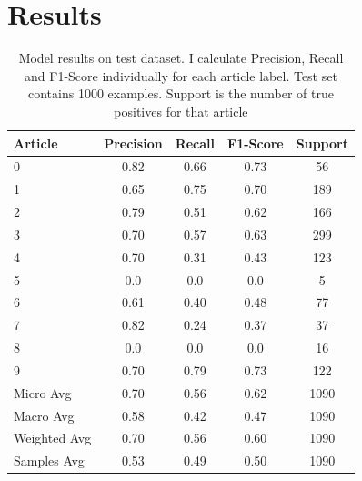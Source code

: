 \documentclass{article}
\begin{document}
\section{Results}

\begin{table}[H]
    \centering
    \begin{tabular}{|l|c|c|c|c|}
    \hline
        Article & Precision & Recall & F1-Score & Support \\ \hline
        0 & 0.82 & 0.66 & 0.73 & 56 \\ \hline
        1 & 0.65 & 0.75 & 0.70 & 189 \\ \hline
        2 & 0.79 & 0.51 & 0.62 & 166 \\ \hline
        3 & 0.70 & 0.57& 0.63& 299 \\ \hline
        4 & 0.70& 0.31& 0.43& 123 \\ \hline
        5 & 0.0 & 0.0 & 0.0 & 5 \\ \hline
        6 & 0.61& 0.40& 0.48& 77 \\ \hline
        7 & 0.82& 0.24& 0.37& 37 \\ \hline
        8 & 0.0 & 0.0 & 0.0 & 16 \\ \hline
        9 & 0.70& 0.79& 0.73& 122 \\ \hline
        Micro Avg & 0.70& 0.56& 0.62& 1090 \\ \hline
        Macro Avg & 0.58& 0.42& 0.47& 1090 \\ \hline
        Weighted Avg & 0.70& 0.56& 0.60& 1090 \\ \hline
        Samples Avg & 0.53& 0.49& 0.50& 1090 \\ \hline
    \end{tabular}
    \caption{Model results on test dataset. I calculate Precision, 
    Recall and F1-Score individually for each article label. 
    Test set contains 1000 examples.
    Support is the number of true positives for that article}
\end{table}
\end{document}
